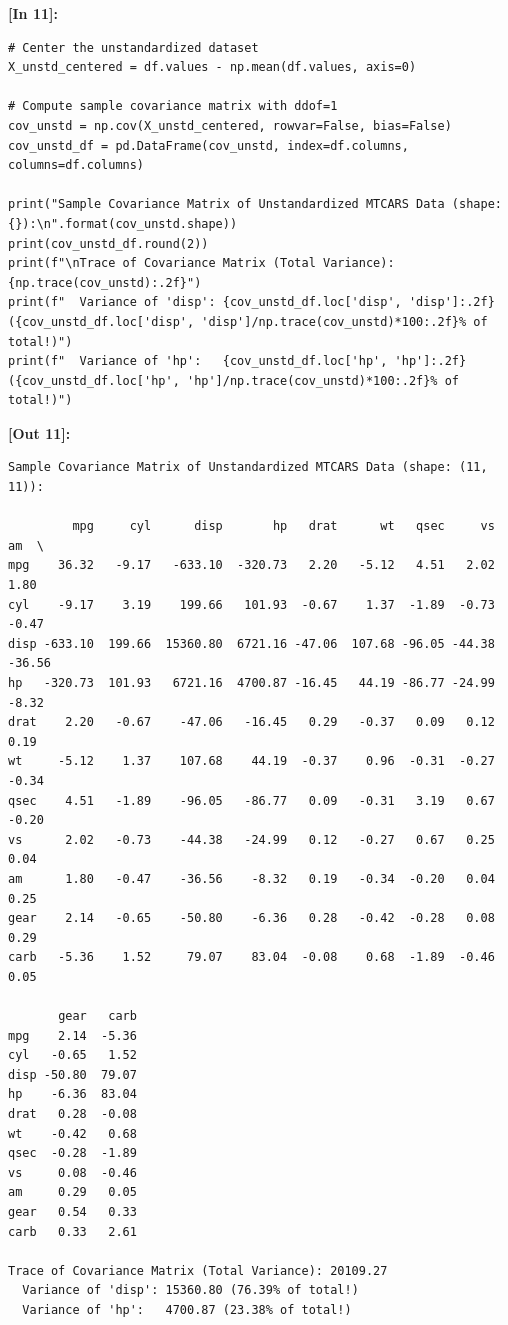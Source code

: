 \vspace{0.6em}
\noindent\textbf{\small [In 11]:}
\begin{lstlisting}[style=pycode]
# Center the unstandardized dataset
X_unstd_centered = df.values - np.mean(df.values, axis=0)

# Compute sample covariance matrix with ddof=1
cov_unstd = np.cov(X_unstd_centered, rowvar=False, bias=False)
cov_unstd_df = pd.DataFrame(cov_unstd, index=df.columns, columns=df.columns)

print("Sample Covariance Matrix of Unstandardized MTCARS Data (shape: {}):\n".format(cov_unstd.shape))
print(cov_unstd_df.round(2))
print(f"\nTrace of Covariance Matrix (Total Variance): {np.trace(cov_unstd):.2f}")
print(f"  Variance of 'disp': {cov_unstd_df.loc['disp', 'disp']:.2f} ({cov_unstd_df.loc['disp', 'disp']/np.trace(cov_unstd)*100:.2f}% of total!)")
print(f"  Variance of 'hp':   {cov_unstd_df.loc['hp', 'hp']:.2f} ({cov_unstd_df.loc['hp', 'hp']/np.trace(cov_unstd)*100:.2f}% of total!)")
\end{lstlisting}
\noindent\textbf{\small [Out 11]:}
\begin{lstlisting}[style=output]
Sample Covariance Matrix of Unstandardized MTCARS Data (shape: (11, 11)):

         mpg     cyl      disp       hp   drat      wt   qsec     vs     am  \
mpg    36.32   -9.17   -633.10  -320.73   2.20   -5.12   4.51   2.02   1.80   
cyl    -9.17    3.19    199.66   101.93  -0.67    1.37  -1.89  -0.73  -0.47   
disp -633.10  199.66  15360.80  6721.16 -47.06  107.68 -96.05 -44.38 -36.56   
hp   -320.73  101.93   6721.16  4700.87 -16.45   44.19 -86.77 -24.99  -8.32   
drat    2.20   -0.67    -47.06   -16.45   0.29   -0.37   0.09   0.12   0.19   
wt     -5.12    1.37    107.68    44.19  -0.37    0.96  -0.31  -0.27  -0.34   
qsec    4.51   -1.89    -96.05   -86.77   0.09   -0.31   3.19   0.67  -0.20   
vs      2.02   -0.73    -44.38   -24.99   0.12   -0.27   0.67   0.25   0.04   
am      1.80   -0.47    -36.56    -8.32   0.19   -0.34  -0.20   0.04   0.25   
gear    2.14   -0.65    -50.80    -6.36   0.28   -0.42  -0.28   0.08   0.29   
carb   -5.36    1.52     79.07    83.04  -0.08    0.68  -1.89  -0.46   0.05   

       gear   carb  
mpg    2.14  -5.36  
cyl   -0.65   1.52  
disp -50.80  79.07  
hp    -6.36  83.04  
drat   0.28  -0.08  
wt    -0.42   0.68  
qsec  -0.28  -1.89  
vs     0.08  -0.46  
am     0.29   0.05  
gear   0.54   0.33  
carb   0.33   2.61  

Trace of Covariance Matrix (Total Variance): 20109.27
  Variance of 'disp': 15360.80 (76.39% of total!)
  Variance of 'hp':   4700.87 (23.38% of total!)
\end{lstlisting}

